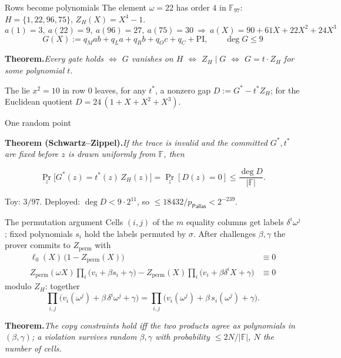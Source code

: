 \documentclass[aspectratio=169,11pt]{beamer}
\newcommand{\F}{\mathbb{F}}
\newcommand{\pP}{p_{\mathsf{Pallas}}}
\newcommand{\ZH}{Z_H}
\newcommand{\stmt}[2]{\par\smallskip\noindent\textbf{#1}\enspace\textit{#2}\par}
\begin{document}
\begin{frame}{Rows become polynomials}
The element $\omega = 22$ has order $4$ in $\F_{97}$: $H = \{1, 22, 96, 75\}$, $\ZH(X) = X^4 - 1$.
\[
a(1) = 3,\ a(22) = 9,\ a(96) = 27,\ a(75) = 30
\ \Longrightarrow\
a(X) = 90 + 61X + 22X^2 + 24X^3
\]
\[
G(X) := q_M a b + q_L a + q_R b + q_O c + q_C + \mathrm{PI},\qquad \deg G \le 9
\]
\vfill
\stmt{Theorem.}{Every gate holds $\iff$ $G$ vanishes on $H$ $\iff$ $\ZH \mid
G$ $\iff$ $G = t \cdot \ZH$ for some polynomial $t$.}
\vfill
The lie $x^2 = 10$ in row $0$ leaves, for any $t^{*}$, a nonzero gap
$D := G^{*} - t^{*}\ZH$; for the Euclidean quotient $D = 24\,(1 + X + X^2 + X^3)$.
\end{frame}

\begin{frame}{One random point}
\stmt{Theorem (Schwartz--Zippel).}{If the trace is invalid and the committed
$G^{*}, t^{*}$ are fixed before $z$ is drawn uniformly from $\F$, then}
\[
\Pr_z\bigl[G^{*}(z) = t^{*}(z)\,\ZH(z)\bigr] = \Pr_z[D(z) = 0] \le \frac{\deg D}{|\F|}.
\]
\begin{center}
\end{center}
Toy: $3/97$. Deployed: $\deg D < 9 \cdot 2^{11}$, so $\le 18432/\pP < 2^{-239}$.
\end{frame}

\begin{frame}{The permutation argument}
\small
Cells $(i, j)$ of the $m$ equality columns get labels $\delta^i \omega^j$;
fixed polynomials $s_i$ hold the labels permuted by $\sigma$. After
challenges $\beta, \gamma$ the prover commits to $Z_{\mathrm{perm}}$ with
\begin{align*}
\ell_0(X)\,\bigl(1 - Z_{\mathrm{perm}}(X)\bigr) &\equiv 0 \\
Z_{\mathrm{perm}}(\omega X) \prod_i \bigl(v_i + \beta s_i + \gamma\bigr)
- Z_{\mathrm{perm}}(X) \prod_i \bigl(v_i + \beta \delta^i X + \gamma\bigr) &\equiv 0
\end{align*}
modulo $\ZH$: together
\[
\prod_{i,j} \bigl(v_i(\omega^j) + \beta\,\delta^i \omega^j + \gamma\bigr)
= \prod_{i,j} \bigl(v_i(\omega^j) + \beta\,s_i(\omega^j) + \gamma\bigr).
\]
\stmt{Theorem.}{The copy constraints hold iff the two products agree as
polynomials in $(\beta, \gamma)$; a violation survives random $\beta, \gamma$
with probability $\le 2N/|\F|$, $N$ the number of cells.}
\end{frame}
\end{document}

